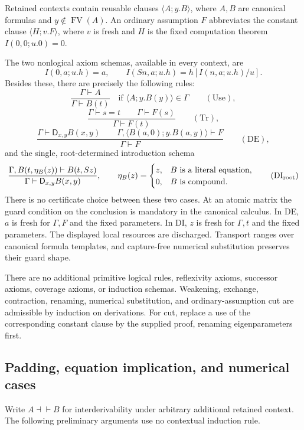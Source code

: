 Retained contexts contain reusable clauses
$\langle A;y.B\rangle$, where $A,B$ are canonical formulas and
$y\notin\operatorname{FV}(A)$.  An ordinary assumption $F$ abbreviates
the constant clause $\langle H;v.F\rangle$, where $v$ is fresh and
$H$ is the fixed computation theorem $I(0,0;u.0)=0$.

The two nonlogical axiom schemas, available in every context, are
\[
 I(0,a;u.h)=a,\qquad
 I(Sn,a;u.h)=h[I(n,a;u.h)/u].
\tag{I0,IS}\label{eq:guarded-computation}
\]
Besides these, there are precisely the following rules:
\[
 \frac{\Gamma\vdash A}{\Gamma\vdash B(t)}
 \quad\text{if }\langle A;y.B(y)\rangle\in\Gamma
 \qquad(\mathrm{Use}),
\]
\[
 \frac{\Gamma\vdash s=t\qquad\Gamma\vdash F(s)}
      {\Gamma\vdash F(t)}\qquad(\mathrm{Tr}),
\]
\[
 \frac{\Gamma\vdash\mathsf D_{x,y}B(x,y)\qquad
       \Gamma,\langle B(a,0);y.B(a,y)\rangle\vdash F}
      {\Gamma\vdash F}\qquad(\mathrm{DE}),
\]
and the single, root-determined introduction schema
\[
 \frac{\Gamma,B(t,\eta_B(z))\vdash B(t,Sz)}
      {\Gamma\vdash\mathsf D_{x,y}B(x,y)},
 \qquad
 \eta_B(z)=
 \begin{cases}
 z,& B\text{ is a literal equation},\\
 0,& B\text{ is compound}.
 \end{cases}
 \tag{DI$_{\rm root}$}\label{eq:guarded-di}
\]
There is no certificate choice between these two cases.  At an atomic
matrix the guard condition on the conclusion is mandatory in the
canonical calculus.  In DE, $a$ is fresh for $\Gamma,F$ and the fixed
parameters.  In DI, $z$ is fresh for $\Gamma,t$ and the fixed
parameters.  The displayed local resources are discharged.
Transport ranges over canonical formula templates, and capture-free
numerical substitution preserves their guard shape.

There are no additional primitive logical rules, reflexivity axioms,
successor axioms, coverage axioms, or induction schemas.
Weakening, exchange, contraction, renaming, numerical substitution, and
ordinary-assumption cut are admissible by induction on derivations.
For cut, replace a use of the corresponding constant clause by the
supplied proof, renaming eigenparameters first.

\subsection{Padding, equation implication, and numerical cases}

Write $A\dashv\vdash B$ for interderivability under arbitrary additional
retained context.  The following preliminary arguments use no
contextual induction rule.

